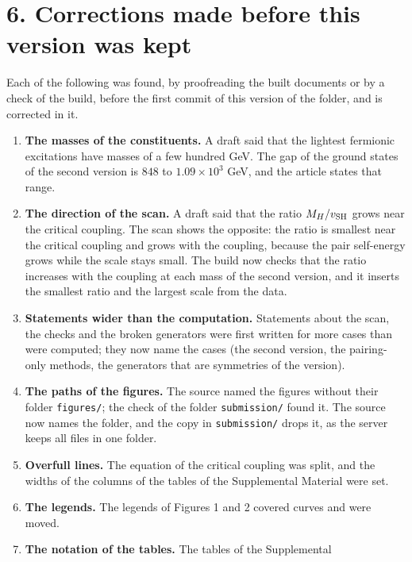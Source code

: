 \documentclass[
  10pt,
]{article}
\providecommand{\tightlist}{%
  \setlength{\itemsep}{0pt}\setlength{\parskip}{0pt}}
\begin{document}
\hypertarget{corrections-made-before-this-version-was-kept}{%
\section{6. Corrections made before this version was
kept}\label{corrections-made-before-this-version-was-kept}}

Each of the following was found, by proofreading the built documents or
by a check of the build, before the first commit of this version of the
folder, and is corrected in it.

\begin{enumerate}
\def\labelenumi{\arabic{enumi}.}
\tightlist
\item
  \textbf{The masses of the constituents.} A draft said that the
  lightest fermionic excitations have masses of a few hundred GeV. The
  gap of the ground states of the second version is \(848\) to
  \(1.09\times10^{3}\) GeV, and the article states that range.
\item
  \textbf{The direction of the scan.} A draft said that the ratio
  \(M_H/v_{\rm SH}\) grows near the critical coupling. The scan shows
  the opposite: the ratio is smallest near the critical coupling and
  grows with the coupling, because the pair self-energy grows while the
  scale stays small. The build now checks that the ratio increases with
  the coupling at each mass of the second version, and it inserts the
  smallest ratio and the largest scale from the data.
\item
  \textbf{Statements wider than the computation.} Statements about the
  scan, the checks and the broken generators were first written for more
  cases than were computed; they now name the cases (the second version,
  the pairing-only methods, the generators that are symmetries of the
  version).
\item
  \textbf{The paths of the figures.} The source named the figures
  without their folder \texttt{figures/}; the check of the folder
  \texttt{submission/} found it. The source now names the folder, and
  the copy in \texttt{submission/} drops it, as the server keeps all
  files in one folder.
\item
  \textbf{Overfull lines.} The equation of the critical coupling was
  split, and the widths of the columns of the tables of the Supplemental
  Material were set.
\item
  \textbf{The legends.} The legends of Figures 1 and 2 covered curves
  and were moved.
\item
  \textbf{The notation of the tables.} The tables of the Supplemental

\end{enumerate}
\end{document}
